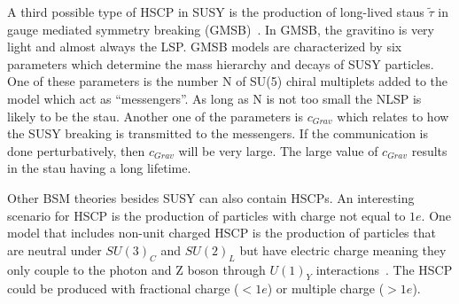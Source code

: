 
A third possible type of HSCP in SUSY is the production of long-lived staus $\tilde{\tau}$ in gauge mediated symmetry breaking (GMSB)~\cite{Giudice:1998bp}. 
In GMSB, the gravitino is very light and almost always the LSP.
GMSB models are characterized by six parameters which determine the mass hierarchy and decays of SUSY particles.
One of these parameters is the number N of SU(5) chiral multiplets added to the model which act as ``messengers''.
As long as N is not too small the NLSP is likely to be the stau.
Another one of the parameters is $c_{Grav}$ which relates to how the SUSY breaking is transmitted to the messengers.
If the communication is done perturbatively, then $c_{Grav}$ will be very large.
The large value of $c_{Grav}$ results in the stau having a long lifetime.

Other BSM theories besides SUSY can also contain HSCPs.
An interesting scenario for HSCP is the production of particles with charge not equal to $1e$.
One model that includes non-unit charged HSCP is the production of particles that are neutral under $SU(3)_C$ and $SU(2)_L$ 
but have electric charge meaning they only couple to the photon and Z boson through $U(1)_Y$ interactions~\cite{Langacker:2011db}.
The HSCP could be produced with fractional charge ($<1e$) or multiple charge ($>1e$).

